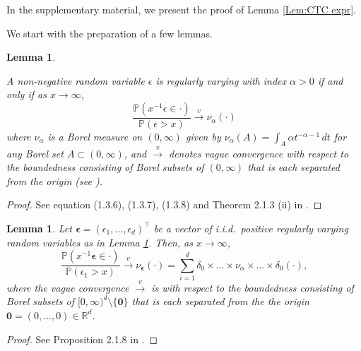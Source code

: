 \documentclass[10pt]{article}
\newtheorem{lemma}[theorem]{Lemma}
\begin{document}
In the supplementary material, we present the proof of Lemma \ref{Lem:CTC expr}.

We start with the preparation of a few lemmas.
 
\begin{lemma}\label{Lem:uni RV}
    
A non-negative random variable $\epsilon$ is    regularly varying  with index $\alpha > 0$ if and only if   as $x \to \infty$,
$$
    \frac{\mathbb{P}(x^{-1}\epsilon \in \cdot)}{\mathbb{P}(\epsilon > x)} \xrightarrow{v} \nu_{\alpha}(\cdot)
$$
where $\nu_\alpha$ is a Borel measure on $(0,\infty)$ given by  $\nu_{\alpha}(A) = \int_A \alpha t^{-\alpha -1} \, dt$ for any Borel set $A \subset (0, \infty)$, and $\xrightarrow{v}$ denotes vague convergence with respect to the boundedness consisting of Borel subsets of $(0, \infty)$ that is each separated from the origin  (see \cite[Appendix B]{kulik2020heavy}).

\end{lemma}
\begin{proof}
    See  equation (1.3.6), (1.3.7), (1.3.8) and Theorem 2.1.3 (ii) in \cite{kulik2020heavy}.
\end{proof}






 
    \begin{lemma}\label{Lem:iid tail}
    Let $\boldsymbol{\epsilon} = (\epsilon_1, \dots, \epsilon_d)^\top$ be a vector of i.i.d.\ positive regularly varying random variables as in Lemma \ref{Lem:uni RV}. Then, as $x \to \infty$,
\[
    \frac{\mathbb{P}(x^{-1}\boldsymbol{\epsilon} \in \cdot)}{\mathbb{P}(\epsilon_1 > x)} \xrightarrow{v} \nu_{\boldsymbol{\epsilon}}(\cdot) = \sum_{i=1}^d \delta_0 \times \dots \times \nu_{\alpha} \times \dots \times \delta_0 (\cdot),
\]
where the vague convergence $\xrightarrow{v}$ is with respect to the boundedness consisting of Borel subsets of $[0,\infty)^d\setminus\{\mathbf{0}\}$ that is each separated from the the origin $\mathbf{0}=(0,\ldots,0)\in \mathbb{R}^d$.
\end{lemma}
\begin{proof}
    See Proposition 2.1.8 in \cite{kulik2020heavy}.
\end{proof}
 
\end{document}
